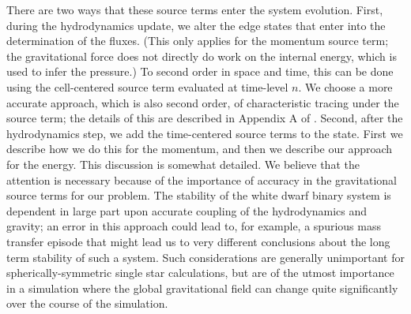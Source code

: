 \documentclass[12pt]{article}
\begin{document}
There are two ways that these source terms enter the system evolution. 
First, during the hydrodynamics update, we alter the edge states that enter
into the determination of the fluxes. (This only applies for the momentum source term;
the gravitational force does not directly do work on the internal energy, which is used 
to infer the pressure.) To second order in space and time, 
this can be done using the cell-centered
source term evaluated at time-level $n$. We choose a more accurate approach, 
which is also second order, of characteristic tracing
under the source term; the details of this are described in Appendix A of \cite{wdmergerI}.
Second, after the hydrodynamics step, we add the time-centered source terms
to the state. First we describe how we do this for the momentum,
and then we describe our approach for the energy. This discussion is somewhat detailed.
We believe that the attention is necessary because of the importance of accuracy
in the gravitational source terms for our problem. The stability of the white dwarf binary
system is dependent in large part upon accurate coupling of the hydrodynamics and gravity;
an error in this approach could lead to, for example, a spurious mass transfer episode
that might lead us to very different conclusions about the long term stability of such a system.
Such considerations are generally unimportant for spherically-symmetric single star calculations,
but are of the utmost importance in a simulation where the global gravitational field can change 
quite significantly over the course of the simulation.
\end{document}
